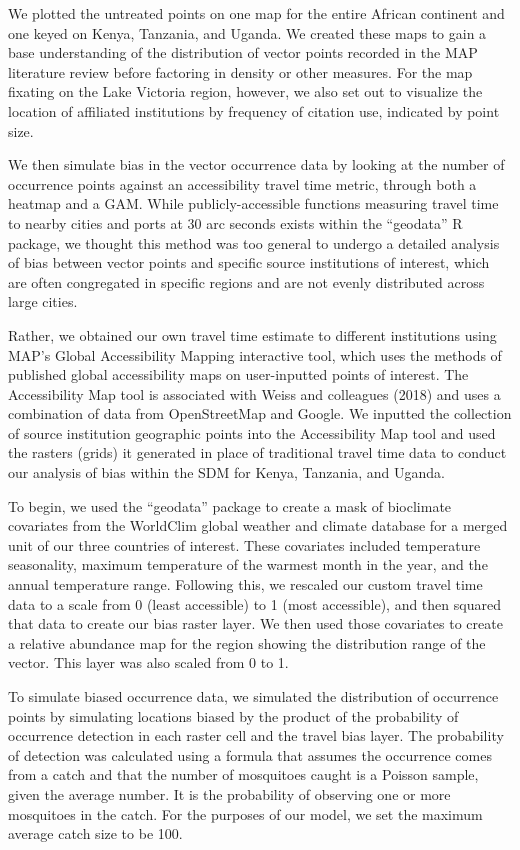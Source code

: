 \documentclass[sn-nature]{sn-jnl}%
\begin{document}
We plotted the untreated points on one map for the entire African continent and one keyed on Kenya, Tanzania, and Uganda. We created these maps to gain a base understanding of the distribution of vector points recorded in the MAP literature review before factoring in density or other measures. For the map fixating on the Lake Victoria region, however, we also set out to visualize the location of affiliated institutions by frequency of citation use, indicated by point size.

We then simulate bias in the vector occurrence data by looking at the number of occurrence points against an accessibility travel time metric, through both a heatmap and a GAM. While publicly-accessible functions measuring travel time to nearby cities and ports at 30 arc seconds exists within the “geodata” R package, we thought this method was too general to undergo a detailed analysis of bias between vector points and specific source institutions of interest, which are often congregated in specific regions and are not evenly distributed across large cities. 

Rather, we obtained our own travel time estimate to different institutions using MAP’s Global Accessibility Mapping interactive tool, which uses the methods of published global accessibility maps on user-inputted points of interest. The Accessibility Map tool is associated with Weiss and colleagues (2018) and uses a combination of data from OpenStreetMap and Google. We inputted the collection of source institution geographic points into the Accessibility Map tool and used the rasters (grids) it generated in place of traditional travel time data to conduct our analysis of bias within the SDM for Kenya, Tanzania, and Uganda.

To begin, we used the “geodata” package to create a mask of bioclimate covariates from the WorldClim global weather and climate database for a merged unit of our three countries of interest. These covariates included temperature seasonality, maximum temperature of the warmest month in the year, and the annual temperature range. Following this, we rescaled our custom travel time data to a scale from 0 (least accessible) to 1 (most accessible), and then squared that data to create our bias raster layer. We then used those covariates to create a relative abundance map for the region showing the distribution range of the vector. This layer was also scaled from 0 to 1. 

To simulate biased occurrence data, we simulated the distribution of occurrence points by
simulating locations biased by the product of the probability of occurrence detection in each raster cell and the travel bias layer. The probability of detection was calculated using a formula that assumes the occurrence comes from a catch and that the number of mosquitoes caught is a Poisson sample, given the average number. It is the probability of observing one or more mosquitoes in the catch. For the purposes of our model, we set the maximum average catch size to be 100. 
\end{document}
